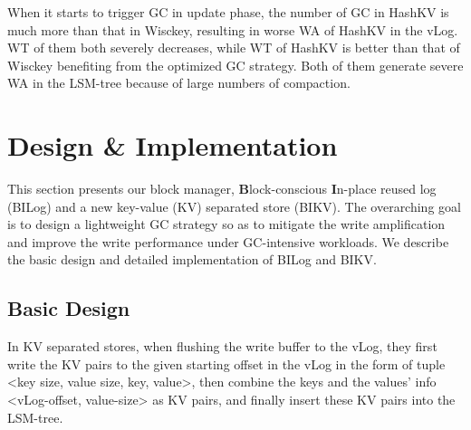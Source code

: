 \documentclass[sigconf]{acmart}
\begin{document}
When it starts to trigger GC in update phase, the number of GC in HashKV is much more than that in Wisckey, resulting in worse WA of HashKV in the vLog. WT of them both severely decreases, while WT of HashKV is better than that of Wisckey benefiting from the optimized GC strategy. Both of them generate severe WA in the LSM-tree because of large numbers of compaction. 



\section{Design \& Implementation}
This section presents our block manager, \textbf{B}lock-conscious \textbf{I}n-place reused log (BILog) and a new key-value (KV) separated store (BIKV). The overarching goal is to design a lightweight GC strategy so as to mitigate the write amplification and improve the write performance under GC-intensive workloads. We describe the basic design and detailed implementation of BILog and BIKV.

\subsection{Basic Design}
In KV separated stores, when flushing the write buffer to the vLog, they first write the KV pairs to the given starting offset in the vLog in the form of tuple \textless key size, value size, key, value\textgreater, then combine the keys and the values’ info \textless vLog-offset, value-size\textgreater{} as KV pairs, and finally insert these KV pairs into the LSM-tree.
\end{document}
